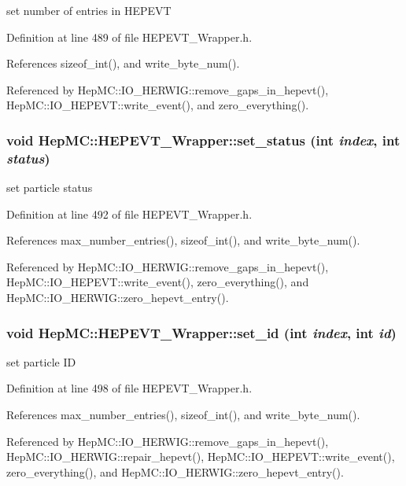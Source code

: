set number of entries in HEPEVT 



Definition at line 489 of file HEPEVT\_\-Wrapper.h.

References sizeof\_\-int(), and write\_\-byte\_\-num().

Referenced by Hep\-MC::IO\_\-HERWIG::remove\_\-gaps\_\-in\_\-hepevt(), Hep\-MC::IO\_\-HEPEVT::write\_\-event(), and zero\_\-everything().
\subsubsection{\setlength{\rightskip}{0pt plus 5cm}void Hep\-MC::HEPEVT\_\-Wrapper::set\_\-status (int {\em index}, int {\em status})\hspace{0.3cm}{\tt  [inline, static]}}\label{classHepMC_1_1HEPEVT__Wrapper_e4906912975bc5387668f60358ccdbce}


set particle status 



Definition at line 492 of file HEPEVT\_\-Wrapper.h.

References max\_\-number\_\-entries(), sizeof\_\-int(), and write\_\-byte\_\-num().

Referenced by Hep\-MC::IO\_\-HERWIG::remove\_\-gaps\_\-in\_\-hepevt(), Hep\-MC::IO\_\-HEPEVT::write\_\-event(), zero\_\-everything(), and Hep\-MC::IO\_\-HERWIG::zero\_\-hepevt\_\-entry().
\subsubsection{\setlength{\rightskip}{0pt plus 5cm}void Hep\-MC::HEPEVT\_\-Wrapper::set\_\-id (int {\em index}, int {\em id})\hspace{0.3cm}{\tt  [inline, static]}}\label{classHepMC_1_1HEPEVT__Wrapper_230782d536e6476884ac8b571c896f58}


set particle ID 



Definition at line 498 of file HEPEVT\_\-Wrapper.h.

References max\_\-number\_\-entries(), sizeof\_\-int(), and write\_\-byte\_\-num().

Referenced by Hep\-MC::IO\_\-HERWIG::remove\_\-gaps\_\-in\_\-hepevt(), Hep\-MC::IO\_\-HERWIG::repair\_\-hepevt(), Hep\-MC::IO\_\-HEPEVT::write\_\-event(), zero\_\-everything(), and Hep\-MC::IO\_\-HERWIG::zero\_\-hepevt\_\-entry().

